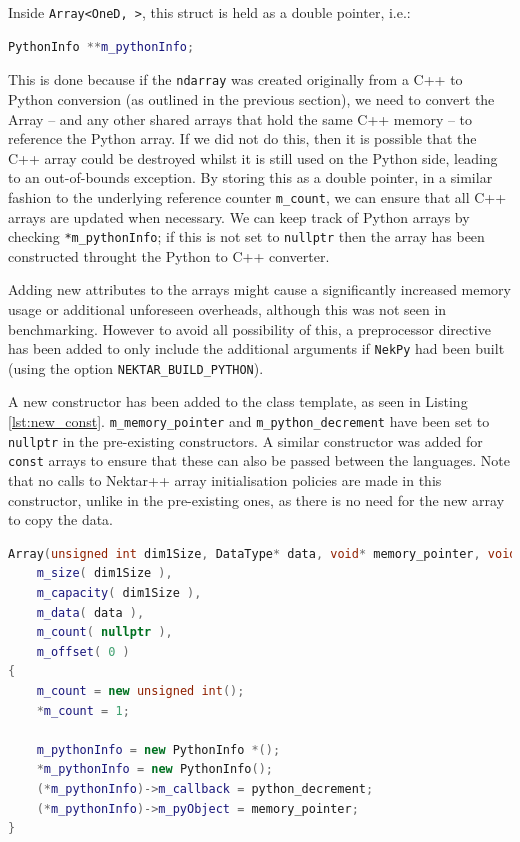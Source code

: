 Inside \texttt{Array<OneD, >}, this struct is held as a double pointer, i.e.:
\begin{lstlisting}[language=C++]
PythonInfo **m_pythonInfo;
\end{lstlisting}
This is done because if the \texttt{ndarray} was created originally from a C++
to Python conversion (as outlined in the previous section), we need to convert
the Array -- and any other shared arrays that hold the same C++ memory -- to
reference the Python array. If we did not do this, then it is possible that the
C++ array could be destroyed whilst it is still used on the Python side, leading
to an out-of-bounds exception. By storing this as a double pointer, in a similar
fashion to the underlying reference counter \texttt{m\_count}, we can ensure
that all C++ arrays are updated when necessary. We can keep track of Python
arrays by checking \texttt{*m\_pythonInfo}; if this is not set to
\texttt{nullptr} then the array has been constructed throught the Python to C++
converter.

Adding new attributes to the arrays might cause a significantly increased memory
usage or additional unforeseen overheads, although this was not seen in
benchmarking. However to avoid all possibility of this, a preprocessor directive
has been added to only include the additional arguments if \texttt{NekPy} had
been built (using the option \texttt{NEKTAR\_BUILD\_PYTHON}).

A new constructor has been added to the class template, as seen in Listing \ref{lst:new_const}. 
\texttt{m\_memory\_pointer} and \texttt{m\_python\_decrement} have been set to 
\texttt{nullptr} in the pre-existing constructors. A similar constructor was added for 
\texttt{const} arrays to ensure that these can also be passed between the languages. Note that 
no calls to Nektar++ array initialisation policies are made in this constructor, unlike in 
the pre-existing ones, as there is no need for the new array to copy the data.

\begin{lstlisting}[caption={New constructor for initialising arrays created through the Python to C++ converter method.}, label={lst:new_const}, language=C++]
Array(unsigned int dim1Size, DataType* data, void* memory_pointer, void (*python_decrement)(void *)) :
    m_size( dim1Size ),
    m_capacity( dim1Size ),
    m_data( data ),
    m_count( nullptr ),
    m_offset( 0 )                               
{
    m_count = new unsigned int(); 
    *m_count = 1;

    m_pythonInfo = new PythonInfo *();
    *m_pythonInfo = new PythonInfo();
    (*m_pythonInfo)->m_callback = python_decrement;
    (*m_pythonInfo)->m_pyObject = memory_pointer;
}
\end{lstlisting}

